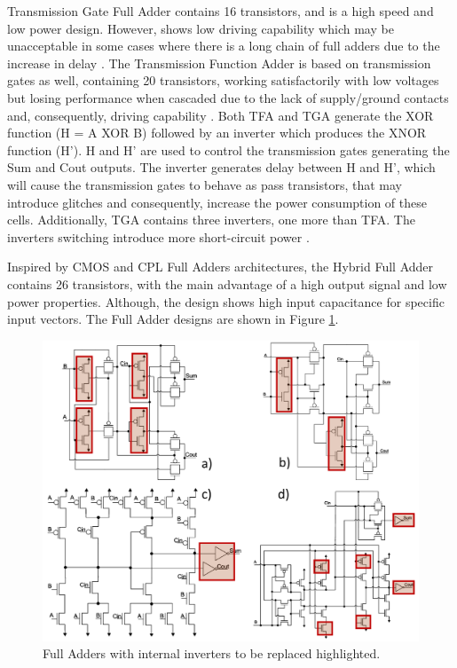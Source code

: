\documentclass[ecp,tc, english]{iiufrgs}
\begin{document}
Transmission Gate Full Adder \cite{weste1985principles} contains 16 transistors, and is a high speed and low power design. However, shows low driving capability which may be unacceptable in some cases where there is a long chain of full adders due to the increase in delay \cite{islam2011design}. The Transmission Function Adder is based on transmission gates as well, containing 20 transistors, working satisfactorily with low voltages but losing performance when cascaded due to the lack of supply/ground contacts and, consequently, driving capability \cite{navi2009novel}. Both TFA and TGA generate the XOR function (H = A XOR B) followed by an inverter which produces the XNOR function (H’). H and H’ are used to control the transmission gates generating the Sum and Cout outputs. The inverter generates delay between H and H’, which will cause the transmission gates to behave as pass transistors, that may introduce glitches and consequently, increase the power consumption of these cells. Additionally, TGA contains three inverters, one more than TFA. The inverters switching introduce more short-circuit power \cite{shams2000novel}.

Inspired by CMOS and CPL Full Adders architectures, the Hybrid Full Adder \cite{navi2009novel} contains 26 transistors, with the main advantage of a high output signal and low power properties. Although, the design shows high input capacitance for specific input vectors. The Full Adder designs are shown in Figure \ref{fig:Fig5}.

\begin{figure}[H]
\centering
\includegraphics[width=1\textwidth]{FAs.png}
\caption{Full Adders with internal inverters to be replaced highlighted.}
\label{fig:Fig5}
\end{figure}
\end{document}

